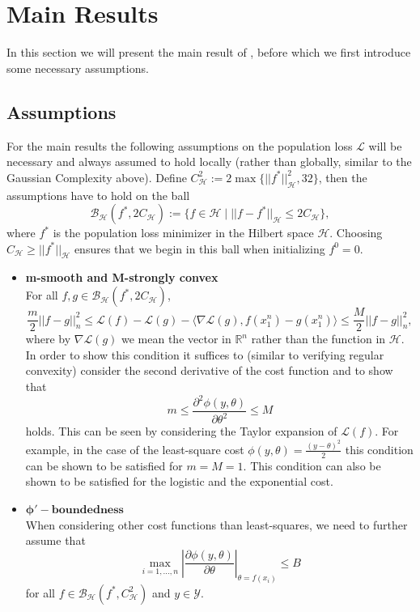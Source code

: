 \section{Main Results}
In this section we will present the main result of \cite{wain17ada}, before which we first introduce some necessary assumptions.
\subsection{Assumptions}
For the main results the following assumptions on the population loss $\mathcal{L}$ will be necessary and always assumed to hold locally (rather than globally, similar to the Gaussian Complexity above). Define $C_{\mathcal{H}}^2 := 2\max\{||f^*||_{\mathcal{H}}^2, 32\}$, then the assumptions have to hold on the ball
\begin{equation}
\mathcal{B}_{\mathcal{H}}(f^*,2C_{\mathcal{H}}) := \{f\in\mathcal{H} \mid ||f-f^*||_{\mathcal{H}} \le 2C_{\mathcal{H}}\},
\end{equation}
where $f^*$ is the population loss minimizer in the Hilbert space $\mathcal{H}$. Choosing $C_{\mathcal{H}}\geq ||f^*||_{\mathcal{H}}$ ensures that we begin in this ball when initializing $f^0=0$.
\begin{itemize}
\item \textbf{m-smooth and M-strongly convex}\\
For all $f,g \in \mathcal{B}_{\mathcal{H}}(f^*,2C_{\mathcal{H}})$,
\begin{equation}
\frac{m}{2}||f-g||_n^2 \le \mathcal{L}(f) - \mathcal{L}(g) - \langle \nabla\mathcal{L}(g), f(x_1^n) - g(x_1^n)\rangle \le \frac{M}{2}||f-g||_n^2,
\end{equation}
where by $\nabla\mathcal{L}(g)$ we mean the vector in $\mathbb{R}^n$ rather than the function in $\mathcal{H}$. In order to show this condition it suffices to (similar to verifying regular convexity) consider the second derivative of the cost function and to show that
\begin{equation*}
m\le \frac{\partial^2\phi(y,\theta)}{\partial\theta^2} \le M
\end{equation*}
holds. This can be seen by considering the Taylor expansion of $\mathcal{L}(f)$. For example, in the case of the least-square cost $\phi(y,\theta)=\frac{(y-\theta)^2}{2}$ this condition can be shown to be satisfied for $m=M=1$. This condition can also be shown to be satisfied for the logistic and the exponential cost.

\item $\mathbf{\phi'-boundedness}$\\
When considering other cost functions than least-squares, we need to further assume that
\begin{equation}
\max_{i=1,\dots,n}\left\lvert \frac{\partial\phi(y,\theta)}{\partial \theta}\right\rvert_{\theta=f(x_i)} \le B
\end{equation}
for all $f\in \mathcal{B}_{\mathcal{H}}(f^*,C_{\mathcal{H}}^2)$ and $y\in \mathcal{Y}$.

\end{itemize}

